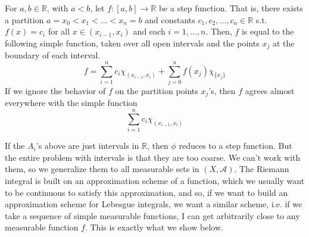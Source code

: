   \begin{example}
    For $a, b \in \mathbb{R}$, with $a < b$, let $f: [a, b] \longrightarrow \mathbb{R}$ be a step function. That is, there exists a partition $a = x_0 < x_1 < \ldots < x_n = b$ and constants $c_1, c_2, \ldots, c_n \in \mathbb{R}$ s.t. $f(x) = c_i$ for all $x \in (x_{i-1}, x_i)$ and each $i = 1, \ldots, n$. Then, $f$ is equal to the following simple function, taken over all open intervals and the points $x_j$ at the boundary of each interval. 
    \begin{equation}
      f = \sum_{i=1}^n c_i \chi_{(x_{i-1}, x_i)} + \sum_{j=0}^n f(x_j) \chi_{\{x_j\}}
    \end{equation}
    If we ignore the behavior of $f$ on the partition points $x_j$'s, then $f$ agrees almost everywhere with the simple function 
    \begin{equation}
      \sum_{i=1}^n c_i \chi_{(x_{i-1}, x_i)}
    \end{equation}
  \end{example}

  If the $A_i$'s above are just intervals in $\mathbb{R}$, then $\phi$ reduces to a step function. But the entire problem with intervals is that they are too coarse. We can't work with them, so we generalize them to all measurable sets in $(X, \mathcal{A})$. The Riemann integral is built on an approximation scheme of a function, which we usually want to be continuous to satisfy this approximation, and so, if we want to build an approximation scheme for Lebesgue integrals, we want a similar scheme, i.e. if we take a sequence of simple measurable functions, I can get arbitrarily close to any measurable function $f$. This is exactly what we show below. 

